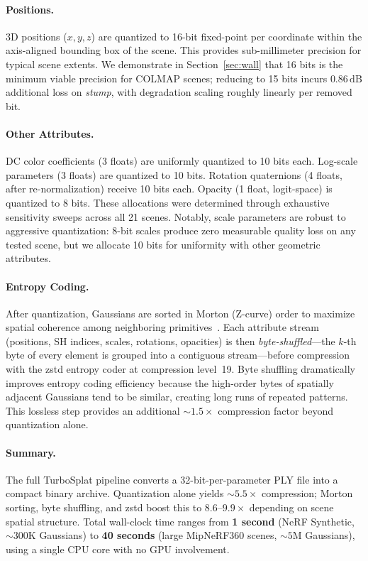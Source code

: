 \documentclass[sigconf,review]{acmart}
\newcommand{\ours}{TurboSplat}
\newcommand{\dB}{\,\text{dB}}
\begin{document}
\paragraph{Positions.}
3D positions ($x, y, z$) are quantized to 16-bit fixed-point per coordinate within the axis-aligned bounding box of the scene.
This provides sub-millimeter precision for typical scene extents.
We demonstrate in Section~\ref{sec:wall} that 16 bits is the minimum viable precision for COLMAP scenes; reducing to 15 bits incurs $0.86\dB$ additional loss on \textit{stump}, with degradation scaling roughly linearly per removed bit.

\paragraph{Other Attributes.}
DC color coefficients (3 floats) are uniformly quantized to 10 bits each.
Log-scale parameters (3 floats) are quantized to 10 bits.
Rotation quaternions (4 floats, after re-normalization) receive 10 bits each.
Opacity (1 float, logit-space) is quantized to 8 bits.
These allocations were determined through exhaustive sensitivity sweeps across all 21 scenes.
Notably, scale parameters are robust to aggressive quantization: 8-bit scales produce zero measurable quality loss on any tested scene, but we allocate 10 bits for uniformity with other geometric attributes.

\paragraph{Entropy Coding.}
After quantization, Gaussians are sorted in Morton (Z-curve) order to maximize spatial coherence among neighboring primitives~\cite{kerbl2023gaussians}.
Each attribute stream (positions, SH indices, scales, rotations, opacities) is then \emph{byte-shuffled}---the $k$-th byte of every element is grouped into a contiguous stream---before compression with the zstd entropy coder at compression level~19.
Byte shuffling dramatically improves entropy coding efficiency because the high-order bytes of spatially adjacent Gaussians tend to be similar, creating long runs of repeated patterns.
This lossless step provides an additional ${\sim}1.5{\times}$ compression factor beyond quantization alone.

\paragraph{Summary.}
The full \ours{} pipeline converts a 32-bit-per-parameter PLY file into a compact binary archive.
Quantization alone yields ${\sim}5.5{\times}$ compression; Morton sorting, byte shuffling, and zstd boost this to $8.6$--$9.9{\times}$ depending on scene spatial structure.
Total wall-clock time ranges from \textbf{1 second} (NeRF Synthetic, ${\sim}300$K Gaussians) to \textbf{40 seconds} (large MipNeRF360 scenes, ${\sim}5$M Gaussians), using a single CPU core with no GPU involvement.
\end{document}
